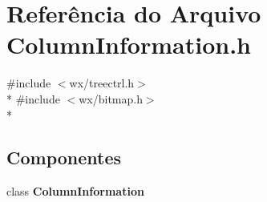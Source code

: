 \section{Referência do Arquivo Column\+Information.\+h}
\label{_column_information_8h}
{\ttfamily \#include $<$wx/treectrl.\+h$>$}\\*
{\ttfamily \#include $<$wx/bitmap.\+h$>$}\\*
\subsection*{Componentes}
\begin{DoxyCompactItemize}
\item 
class {\bf Column\+Information}
\end{DoxyCompactItemize}
